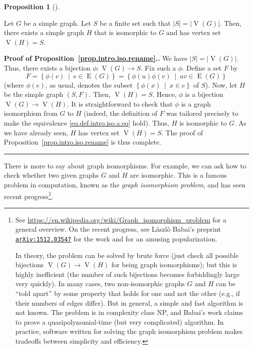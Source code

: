 \documentclass[numbers=enddot,12pt,final,onecolumn,notitlepage]{scrartcl}%
\theoremstyle{definition}
\newtheorem{prop}[theo]{Proposition}
\newenvironment{proposition}[1][]
{\begin{prop}[#1]\begin{leftbar}}
{\end{leftbar}\end{prop}}
\newenvironment{proof}[1][Proof]{\noindent\textbf{#1.} }{\ \rule{0.5em}{0.5em}}
\newcommand\arxiv[1]{\href{http://www.arxiv.org/abs/#1}{\texttt{arXiv:#1}}}
\newcommand{\set}[1]{\left\{ #1 \right\}}
\newcommand{\abs}[1]{\left| #1 \right|}
\newcommand{\tup}[1]{\left( #1 \right)}
\newcommand{\verts}[1]{\operatorname{V}\left( #1 \right)}
\newcommand{\edges}[1]{\operatorname{E}\left( #1 \right)}
\begin{document}
\begin{proposition} \label{prop.intro.iso.rename}
Let $G$ be a simple graph. Let $S$ be a finite set such that
$\abs{S} = \abs{\verts{G}}$. Then, there exists a simple graph $H$
that is isomorphic to $G$ and has vertex set $\verts{H} = S$.
\end{proposition}

\begin{proof}[Proof of Proposition~\ref{prop.intro.iso.rename}.]
We have $\abs{S} = \abs{\verts{G}}$. Thus, there exists a bijection
$\phi : \verts{G} \to S$. Fix such a $\phi$. Define a set
$F$ by
\[
F = \set{ \phi\tup{e} \ \mid \ e \in \edges{G} }
= \set{ \phi\tup{u} \phi\tup{v} \ \mid \ uv \in \edges{G} }
\]
(where $\phi\tup{e}$, as usual, denotes the subset
$\set{\phi\tup{x} \ \mid \ x \in e}$ of $S$). Now, let $H$ be the
simple graph $\tup{S, F}$. Then, $\verts{H} = S$. Hence, $\phi$ is a
bijection $\verts{G} \to \verts{H}$. It is straightforward to check
that $\phi$ is a graph isomorphism from $G$ to $H$
(indeed, the definition of $F$ was tailored precisely to make the
equivalence \eqref{eq.def.intro.iso.a.eq} hold). Thus, $H$ is
isomorphic to $G$. As we have already seen, $H$ has vertex set
$\verts{H} = S$. The proof of Proposition~\ref{prop.intro.iso.rename}
is thus complete.
\end{proof}

There is more to say about graph isomorphisms. For example, we can ask
how to check whether two given graphs $G$ and $H$ are isomorphic.
This is a famous problem in computation, known as the
\textit{graph isomorphism problem}, and has seen recent
progress\footnote{See
\url{https://en.wikipedia.org/wiki/Graph_isomorphism_problem} for a
general overview. On the recent progress, see L\'aszl\`o Babai's
preprint \arxiv{1512.03547}
for the work and \cite{Klarre17} for an amusing popularization.

In theory, the problem can be solved by brute force (just check all
possible bijections $\verts{G} \to \verts{H}$ for being graph
isomorphisms); but this is highly inefficient (the number of
such bijections becomes forbiddingly large very quickly). In many
cases, two non-isomorphic graphs $G$ and $H$ can be ``told apart'' by
some property that holds for one and not the other (e.g., if their
numbers of edges differ). But in general, a simple and fast algorithm
is not known. The problem is in complexity class NP, and Babai's work
claims to prove a quasipolynomial-time (but very complicated)
algorithm. In practice, software written for solving the graph
isomorphism problem makes tradeoffs between simplicity and
efficiency.}.
\end{document}

